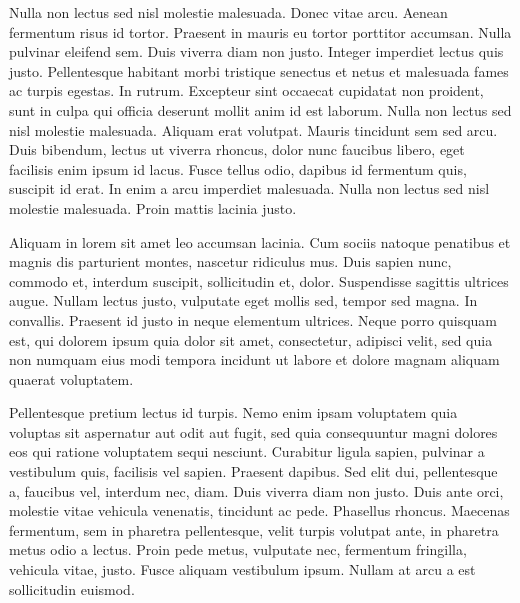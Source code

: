 Nulla non lectus sed nisl molestie malesuada. Donec vitae arcu. Aenean fermentum risus id tortor. Praesent in mauris eu tortor porttitor accumsan. Nulla pulvinar eleifend sem. Duis viverra diam non justo. Integer imperdiet lectus quis justo. Pellentesque habitant morbi tristique senectus et netus et malesuada fames ac turpis egestas. In rutrum. Excepteur sint occaecat cupidatat non proident, sunt in culpa qui officia deserunt mollit anim id est laborum. Nulla non lectus sed nisl molestie malesuada. Aliquam erat volutpat. Mauris tincidunt sem sed arcu. Duis bibendum, lectus ut viverra rhoncus, dolor nunc faucibus libero, eget facilisis enim ipsum id lacus. Fusce tellus odio, dapibus id fermentum quis, suscipit id erat. In enim a arcu imperdiet malesuada. Nulla non lectus sed nisl molestie malesuada. Proin mattis lacinia justo.

Aliquam in lorem sit amet leo accumsan lacinia. Cum sociis natoque penatibus et magnis dis parturient montes, nascetur ridiculus mus. Duis sapien nunc, commodo et, interdum suscipit, sollicitudin et, dolor. Suspendisse sagittis ultrices augue. Nullam lectus justo, vulputate eget mollis sed, tempor sed magna. In convallis. Praesent id justo in neque elementum ultrices. Neque porro quisquam est, qui dolorem ipsum quia dolor sit amet, consectetur, adipisci velit, sed quia non numquam eius modi tempora incidunt ut labore et dolore magnam aliquam quaerat voluptatem.

Pellentesque pretium lectus id turpis. Nemo enim ipsam voluptatem quia voluptas sit aspernatur aut odit aut fugit, sed quia consequuntur magni dolores eos qui ratione voluptatem sequi nesciunt. Curabitur ligula sapien, pulvinar a vestibulum quis, facilisis vel sapien. Praesent dapibus. Sed elit dui, pellentesque a, faucibus vel, interdum nec, diam. Duis viverra diam non justo. Duis ante orci, molestie vitae vehicula venenatis, tincidunt ac pede. Phasellus rhoncus. Maecenas fermentum, sem in pharetra pellentesque, velit turpis volutpat ante, in pharetra metus odio a lectus. Proin pede metus, vulputate nec, fermentum fringilla, vehicula vitae, justo. Fusce aliquam vestibulum ipsum. Nullam at arcu a est sollicitudin euismod.

